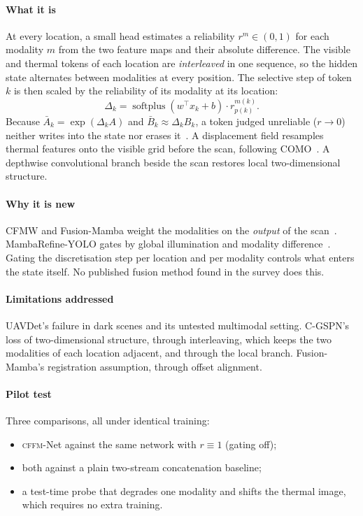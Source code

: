 \documentclass[11pt,a4paper]{article}
\newcommand{\method}{\textsc{cffm}-Net}
\begin{document}
\paragraph{What it is}
At every location, a small head estimates a reliability $r^m\in(0,1)$ for each
modality $m$ from the two feature maps and their absolute difference. The visible and
thermal tokens of each location are \emph{interleaved} in one sequence, so the hidden
state alternates between modalities at every position. The selective step of token
$k$ is then scaled by the reliability of its modality at its location:
\begin{equation}
  \Delta_k=\operatorname{softplus}(w^{\top}x_k+b)\cdot r^{m(k)}_{p(k)} .
  \label{eq:gate}
\end{equation}
Because $\bar A_k=\exp(\Delta_k A)$ and $\bar B_k\approx\Delta_k B_k$, a token judged
unreliable ($r\to0$) neither writes into the state nor erases
it~\citep{gu2023mamba}. A displacement field resamples thermal features onto the
visible grid before the scan, following COMO~\citep{como2024}. A depthwise
convolutional branch beside the scan restores local two-dimensional structure.

\paragraph{Why it is new}
CFMW and Fusion-Mamba weight the modalities on the \emph{output} of the
scan~\citep{li2025cfmw,dong2025fusionmamba}. MambaRefine-YOLO gates by global
illumination and modality difference~\citep{mambarefine2025}. Gating the
discretisation step per location and per modality controls what enters the state
itself. No published fusion method found in the survey does this.

\paragraph{Limitations addressed}
UAVDet's failure in dark scenes and its untested multimodal setting. C-GSPN's loss of
two-dimensional structure, through interleaving, which keeps the two modalities of
each location adjacent, and through the local branch. Fusion-Mamba's registration
assumption, through offset alignment.

\paragraph{Pilot test}
Three comparisons, all under identical training:
\begin{itemize}
  \item \method{} against the same network with $r\equiv1$ (gating off);
  \item both against a plain two-stream concatenation baseline;
  \item a test-time probe that degrades one modality and shifts the thermal image,
        which requires no extra training.
\end{itemize}
\end{document}
